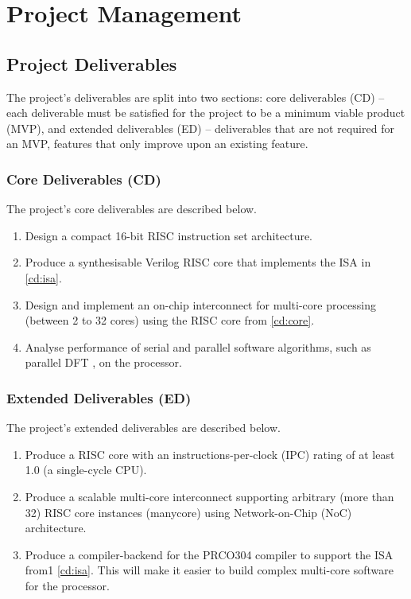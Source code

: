 \documentclass[11pt,a4paper,twoside]{report}
\begin{document}
\chapter{Project Management}

\section{Project Deliverables}
The project's deliverables are split into two sections: core deliverables (CD) -- each deliverable must be satisfied for the project to be a minimum viable product (MVP), and extended deliverables (ED) -- deliverables that are not required for an MVP, features that only improve upon an existing feature.

\subsection{Core Deliverables (CD)}
The project's core deliverables are described below.
\begin{enumerate}[leftmargin=2\parindent, label=\bfseries CD\arabic*.]
    \item{Design a compact 16-bit RISC instruction set architecture.}\label{cd:isa}
    \item{Produce a synthesisable Verilog RISC core that implements the ISA in \ref{cd:isa}.}\label{cd:core}
    \item{Design and implement an on-chip interconnect for multi-core processing (between 2 to 32 cores) using the RISC core from \ref{cd:core}.}
    \item{Analyse performance of serial and parallel software algorithms, such as parallel DFT \cite{dft}, on the processor.}
\end{enumerate}

\subsection{Extended Deliverables (ED)}
The project's extended deliverables are described below.
\begin{enumerate}[leftmargin=2\parindent, label=\bfseries ED\arabic*.]
    \item{Produce a RISC core with an instructions-per-clock (IPC) rating of at least 1.0 (a single-cycle CPU).}
    \item{Produce a scalable multi-core interconnect supporting arbitrary (more than 32) RISC core instances (manycore) using Network-on-Chip (NoC) architecture.}
    \item{Produce a compiler-backend for the PRCO304 \cite{prco304} compiler to support the ISA from1 \ref{cd:isa}. This will make it easier to build complex multi-core software for the processor.}
\end{enumerate}
\end{document}
